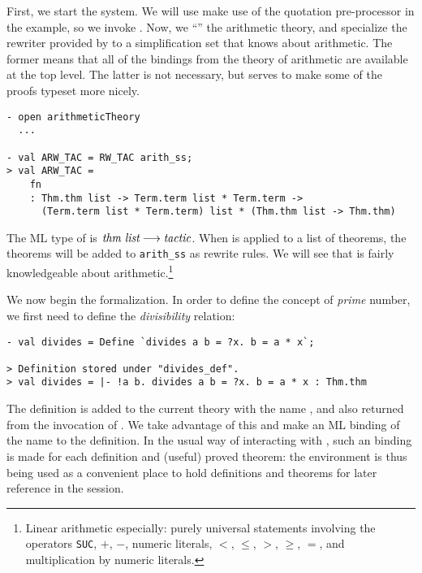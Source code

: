 First, we start the system. We will use make use of the quotation
pre-processor in the example, so we invoke
.  Now, we ``'' the
arithmetic theory, and specialize the rewriter provided by
 to a simplification set that knows about arithmetic.  The
former means that all of the \ML{} bindings from the \HOL{} theory of
arithmetic are available at the top level.  The latter is not
necessary, but serves to make some of the proofs typeset more nicely.
\begin{session}
\begin{verbatim}
- open arithmeticTheory
  ...

- val ARW_TAC = RW_TAC arith_ss;
> val ARW_TAC =
    fn
    : Thm.thm list -> Term.term list * Term.term ->
      (Term.term list * Term.term) list * (Thm.thm list -> Thm.thm)
\end{verbatim}
\end{session}
The ML type of  is $\mbox{\it thm list} \longrightarrow
\mbox{\it tactic}$. When  is applied to a list of theorems, the
theorems will be added to \verb+arith_ss+ as rewrite rules.  We will see
that  is fairly knowledgeable about
arithmetic.\footnote{Linear arithmetic especially: purely universal
statements involving the operators {\tt SUC}, $+$, $-$, numeric
literals, $<$, $\leq$, $>$, $\geq$, $=$, and multiplication by numeric
literals.}

We now begin the formalization. In order to define the concept of  \emph
{prime} number, we first need to define the \emph{divisibility} relation:

\begin{session}\begin{verbatim}
- val divides = Define `divides a b = ?x. b = a * x`;

> Definition stored under "divides_def".
> val divides = |- !a b. divides a b = ?x. b = a * x : Thm.thm
\end{verbatim}\end{session}
    The definition is added to the current theory with the name
    , and also returned from the invocation of
    . We take advantage of this and make an ML binding of
    the name  to the definition. In the usual way of
    interacting with \HOL, such an \ML binding is made for each
    definition and (useful) proved theorem: the \ML environment is
    thus being used as a convenient place to hold definitions and
    theorems for later reference in the session.

